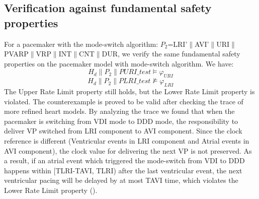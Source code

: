 \subsection{Verification against fundamental safety properties}
For a pacemaker with the mode-switch algorithm: $P_2$=\textsf{LRI'$\|$AVI'$\|$URI$\|$PVARP$\|$VRP$\|$INT$\|$CNT$\|$DUR}, we verify the same fundamental safety properties on the pacemaker model with mode-switch algorithm. We have:
$$H_d\|P_2\|PURI\_test\models\varphi_{URI}$$
$$H_d\|P_2\|PLRI\_test\not\models\varphi_{LRI}$$
The Upper Rate Limit property still holds, but the Lower Rate Limit property is violated. The counterexample is proved to be valid after checking the trace of more refined heart models. By analyzing the trace we found that when the pacemaker is switching from VDI mode to DDD mode, the responsibility to deliver VP switched from LRI component to AVI component. Since the clock reference is different (Ventricular events in LRI component and Atrial events in AVI component), the clock value for delivering the next VP is not preserved. As a result, if an atrial event which triggered the mode-switch from VDI to DDD happens within [TLRI-TAVI, TLRI) after the last ventricular event, the next ventricular pacing will be delayed by at most TAVI time, which violates the Lower Rate Limit property (). 
